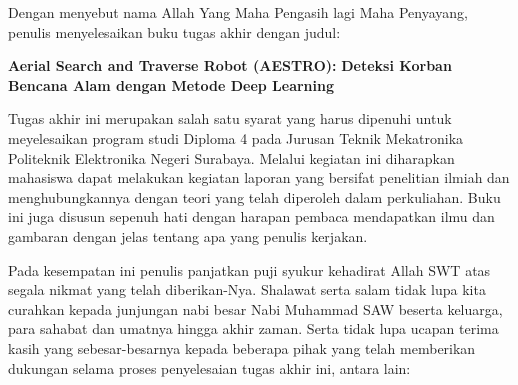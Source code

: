 
\begin{dedication} 

Dengan menyebut nama Allah Yang Maha Pengasih lagi Maha Penyayang, penulis menyelesaikan buku tugas akhir dengan judul:

\begin{center}
\textbf{Aerial Search and Traverse Robot (AESTRO):}
\textbf{Deteksi Korban Bencana Alam dengan Metode Deep Learning}
\end{center}

Tugas akhir ini merupakan salah satu syarat yang harus dipenuhi untuk meyelesaikan program studi Diploma 4 pada Jurusan Teknik Mekatronika Politeknik Elektronika Negeri Surabaya. Melalui kegiatan ini diharapkan mahasiswa dapat melakukan kegiatan laporan yang bersifat penelitian ilmiah dan menghubungkannya dengan teori yang telah diperoleh dalam perkuliahan. Buku ini juga disusun sepenuh hati dengan harapan pembaca mendapatkan ilmu dan gambaran dengan jelas tentang apa yang penulis kerjakan.

Pada kesempatan ini penulis panjatkan puji syukur kehadirat Allah SWT atas segala nikmat yang telah diberikan-Nya. Shalawat serta salam tidak lupa kita curahkan kepada junjungan nabi besar Nabi Muhammad SAW beserta keluarga, para sahabat dan umatnya hingga akhir zaman. Serta tidak lupa ucapan terima kasih yang sebesar-besarnya kepada beberapa pihak yang telah memberikan dukungan selama proses penyelesaian tugas akhir ini, antara lain:


\end{dedication}
